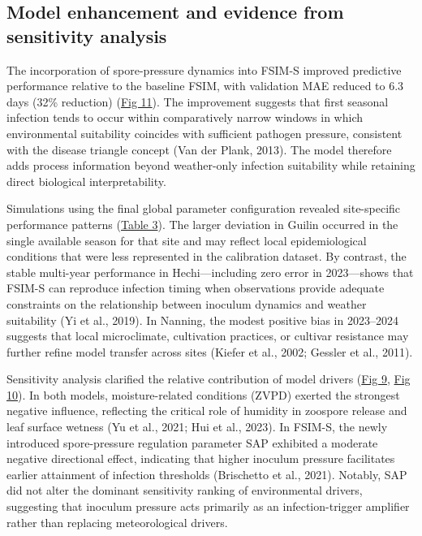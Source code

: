 \documentclass[
]{article}
\begin{document}
\subsection{Model enhancement and evidence from sensitivity
analysis}\label{model-enhancement-and-evidence-from-sensitivity-analysis}

The incorporation of spore-pressure dynamics into FSIM-S improved
predictive performance relative to the baseline FSIM, with validation
MAE reduced to 6.3 days (32\% reduction) (\hyperref[_Ref222858743]{Fig
11}). The improvement suggests that first seasonal infection tends to
occur within comparatively narrow windows in which environmental
suitability coincides with sufficient pathogen pressure, consistent with
the disease triangle concept (Van der Plank, 2013). The model therefore
adds process information beyond weather-only infection suitability while
retaining direct biological interpretability.

Simulations using the final global parameter configuration revealed
site-specific performance patterns (\hyperref[_Ref214273041]{Table 3}).
The larger deviation in Guilin occurred in the single available season
for that site and may reflect local epidemiological conditions that were
less represented in the calibration dataset. By contrast, the stable
multi-year performance in Hechi---including zero error in 2023---shows
that FSIM-S can reproduce infection timing when observations provide
adequate constraints on the relationship between inoculum dynamics and
weather suitability (Yi et al., 2019). In Nanning, the modest positive
bias in 2023--2024 suggests that local microclimate, cultivation
practices, or cultivar resistance may further refine model transfer
across sites (Kiefer et al., 2002; Gessler et al., 2011).

Sensitivity analysis clarified the relative contribution of model
drivers (\hyperref[_Ref222510092]{Fig 9},
\hyperref[_Ref222510103]{Fig 10}). In both models, moisture-related
conditions (ZVPD) exerted the strongest negative influence, reflecting
the critical role of humidity in zoospore release and leaf surface
wetness (Yu et al., 2021; Hui et al., 2023). In
FSIM-S, the newly introduced spore-pressure regulation parameter SAP
exhibited a moderate negative directional effect, indicating that higher
inoculum pressure facilitates earlier attainment of infection thresholds
(Brischetto et al., 2021). Notably, SAP did not alter the dominant
sensitivity ranking of environmental drivers, suggesting that inoculum
pressure acts primarily as an infection-trigger amplifier rather than
replacing meteorological drivers.
\end{document}
